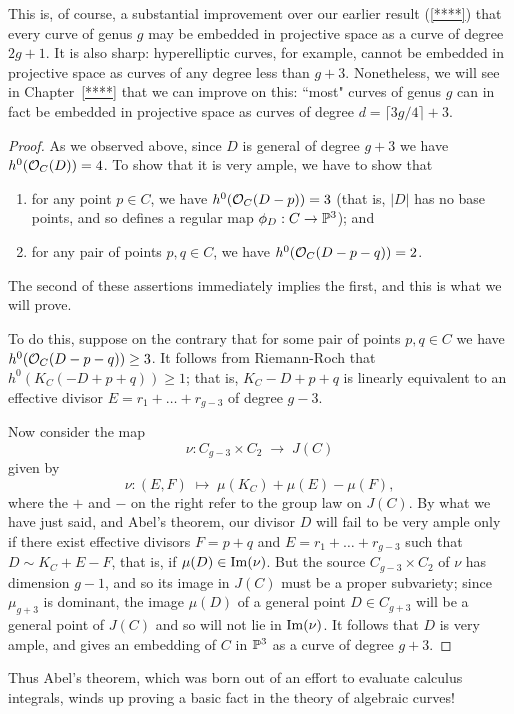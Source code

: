 This is, of course, a substantial improvement over our earlier result (\ref{****}) that every curve of genus $g$ may be embedded in projective space as a curve of degree $2g+1$. It is also sharp: hyperelliptic curves, for example, cannot be embedded in projective space as curves of any degree less than $g+3$. Nonetheless, we will see in Chapter~\ref{****} that we can improve on this: ``most" curves of genus $g$ can in fact be embedded in projective space as curves of degree $d = \lceil 3g/4 \rceil + 3$.

\begin{proof}
As we observed above, since $D$ is general of degree $g+3$ we have $h^0(\cO_C(D)) = 4$. To show that it is very ample, we have to show that
\begin{enumerate}
\item for any point $p \in C$, we have $h^0(\cO_C(D-p)) = 3$ (that is, $|D|$ has no base points, and so defines a regular map $\phi_D : C \to \PP^3$); and
\item for any pair of points $p, q \in C$, we have $h^0(\cO_C(D-p-q)) = 2$.
\end{enumerate}
The second of these assertions immediately implies the first, and this is what we will prove.

To do this, suppose on the contrary that for some pair of points $p, q \in C$ we have $h^0(\cO_C(D-p-q)) \geq 3$. It follows from Riemann-Roch that $h^0(K_C(-D + p + q)) \geq 1$; that is, $K_C -D + p + q$ is linearly equivalent to an effective divisor $E = r_1 + \dots + r_{g-3}$ of degree $g-3$.

Now consider the map
$$
\nu : C_{g-3} \times C_2 \; \to \; J(C)
$$
given by
$$
\nu : (E,F) \; \mapsto \; \mu(K_C) + \mu(E) - \mu(F),
$$
where the $+$ and $-$ on the right refer to the group law on $J(C)$. By what we have just said, and Abel's theorem, our divisor $D$ will fail to be very ample only if there exist effective divisors $F = p+q$ and $E = r_1+\dots+r_{g-3}$ such that $D \sim K_C +E-F$, that is, if
$\mu(D) \in {\rm Im}(\nu)$. But the source $C_{g-3} \times C_2$ of $\nu$ has dimension $g-1$, and so its image in $J(C)$ must be a proper subvariety; since $\mu_{g+3}$ is dominant, the image $\mu(D)$ of a general point $D \in C_{g+3}$ will be a general point of $J(C)$ and so will not lie in ${\rm Im}(\nu)$. It follows that $D$ is very ample, and gives an embedding of $C$ in $\PP^3$ as a curve of degree $g+3$.
\end{proof}

Thus Abel's theorem, which was born out of an effort to evaluate calculus integrals, winds up proving a basic fact in the theory of algebraic curves!

